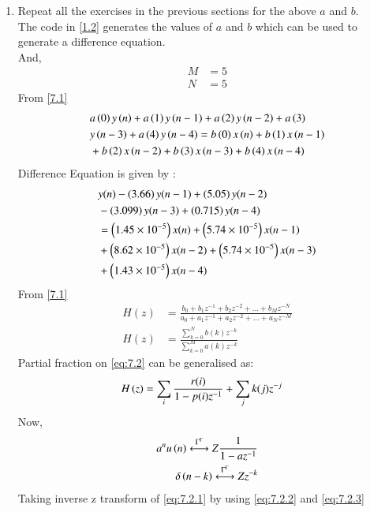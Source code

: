\documentclass[journal,12pt,twocolumn]{IEEEtran}
\theoremstyle{remark}
\begin{document}
\begin{enumerate}[label=\thesection.\arabic*]
\item Repeat all the exercises in the previous sections for the above $a$ and $b$.\\
\solution The code in \ref{1.2} generates the values of $a$ and $b$  which can be used to generate a difference equation.\\
And,
\begin{align}
    M &= 5\\
    N&=5
\end{align}
From \ref{7.1} 
\begin{align}
    &a\left(0\right)y\left(n\right) + a\left(1\right)y\left(n-1\right)+a\left(2\right)y\left(n-2\right)+a\left(3\right)\\ \notag &y\left(n-3\right) + a\left(4\right)y\left(n-4\right) =   b\left(0\right)x\left(n\right) + b\left(1\right)x\left(n-1\right)\\ \notag &+b\left(2\right)x\left(n-2\right)+b\left(3\right)x\left(n-3\right) + b\left(4\right)x\left(n-4\right) 
\end{align}
Difference Equation is given by :
\begin{align}
	&y(n) - \left(3.66\right)y(n - 1) + \left(5.05\right)y(n - 2) \nonumber \\
	&- \left(3.099\right)y(n - 3) + \left(0.715\right)y(n - 4) \nonumber \\
	&= \left(1.45\times 10^{-5}\right)x(n) + \left(5.74 \times 10^{-5}\right)x(n - 1) \nonumber \\
	&+ \left(8.62 \times 10^{-5}\right)x(n - 2) + \left(5.74 \times 10^{-5}\right)x(n - 3) \nonumber \\
	&+ \left(1.43 \times 10^{-5}\right)x(n - 4)
\end{align}
From \eqref{7.1} 
\begin{align}
    H(z) &= \frac{b_0 + b_1 z^{-1} + b_2 z^{-2} + \ldots + b_M z^{-N}}{a_0 + a_1 z^{-1} + a_2 z^{-2} + \ldots + a_N z^{-M}}\\
    H(z) &= \frac{\sum_{k = 0}^{N}b(k)z^{-k}}{\sum_{k = 0}^{M}a(k)z^{-k}} \label{eq:7.2}
\end{align}
Partial fraction on \eqref{eq:7.2} can be generalised as:
\begin{align}
    H\left(z\right)&= \sum_{i}\frac{r(i)}{1 - p(i)z^{-1}} + \sum_{j}k(j)z^{-j}
	\label{eq:7.2.1}
\end{align}
Now,
\begin{align}
    a^{n}u\brak{n} \system{Z} \frac{1}{1-az^{-1}} \label{eq:7.2.2}\\
    \delta\brak{n-k} \system{Z} z^{-k}\label{eq:7.2.3}
\end{align}
Taking inverse z transform of \eqref{eq:7.2.1} by using \eqref{eq:7.2.2} and \eqref{eq:7.2.3}
\begin{align}

\end{align}
\end{enumerate}
\end{document}
